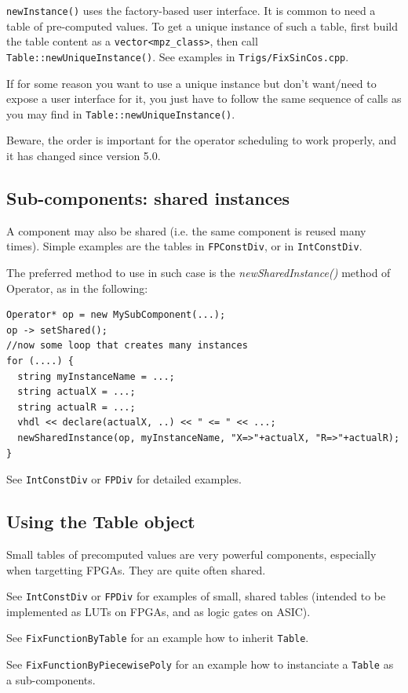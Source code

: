 \documentclass{article}
\begin{document}
\texttt{newInstance()} uses the factory-based user interface.
It is common to need a table of pre-computed values.
To get a unique instance of such a table,  first build the table content as a \verb!vector<mpz_class>!, then call \texttt{Table::newUniqueInstance()}.
See examples in \texttt{Trigs/FixSinCos.cpp}.


If for some reason you want to use a unique instance but don't want/need to expose a user interface for it, you just have to follow the same sequence of calls as you may find in \texttt{Table::newUniqueInstance()}.

Beware, the order is important for the operator scheduling to work properly, and it has changed since version 5.0.

\subsection{Sub-components: shared instances}

A component may also be shared (i.e. the same component is reused many times).
Simple examples are the tables in \texttt{FPConstDiv}, or in \texttt{IntConstDiv}.

The preferred method to use in such case is the \emph{newSharedInstance()} method of Operator, as in the following:
\begin{verbatim}
Operator* op = new MySubComponent(...);
op -> setShared();
//now some loop that creates many instances
for (....) {
  string myInstanceName = ...; 
  string actualX = ...;
  string actualR = ...;
  vhdl << declare(actualX, ..) << " <= " << ...;   
  newSharedInstance(op, myInstanceName, "X=>"+actualX, "R=>"+actualR);
}
\end{verbatim}

See \texttt{IntConstDiv} or \texttt{FPDiv} for detailed examples.

\subsection{Using the Table object}
Small tables of precomputed values are very powerful components, especially when targetting FPGAs.
They are quite often shared.

See \texttt{IntConstDiv} or \texttt{FPDiv} for examples of small, shared tables (intended to be implemented as LUTs on FPGAs, and as logic gates on ASIC).

See \texttt{FixFunctionByTable} for an example how to inherit \texttt{Table}.

See \texttt{FixFunctionByPiecewisePoly} for an example how to instanciate a \texttt{Table} as a sub-components.
\end{document}

